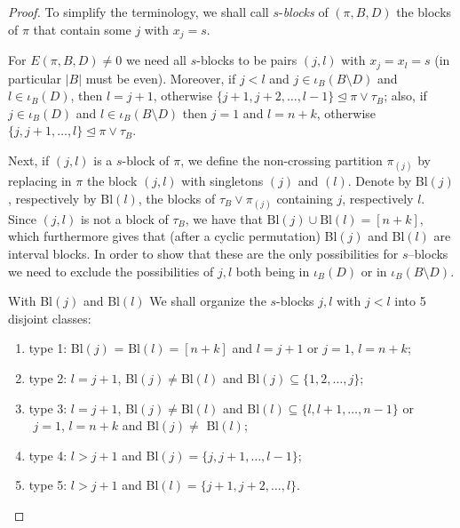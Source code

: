 \documentclass{amsart}
\begin{document}
\begin{proof}
 To simplify the terminology, we shall call $s$-\textit{blocks} of $(\pi, B, D)$ the blocks of $ \pi $ that contain some $j $ with $ x_j =s $.
 
For
 $ E(\pi, B, D) \neq 0$ 
 we need all $s$-blocks  to be pairs $ (j, l)$ with $x_j = x_l = s $ (in  particular $ | B |$ must be even). 
 Moreover, if $ j < l $ and
  $ j \in \iota_{B} (B \setminus D) $ 
  and $ l \in \iota_{B} (D) $, then $ l= j+1$, 
  otherwise 
  $\{ j+1, j+2, \dots, l-1\} \trianglelefteq \pi\vee \tau_B $; also, if 
  $ j \in \iota_{B}(D) $ 
  and 
  $ l \in \iota_{B}(B \setminus D)$
  then $ j=1$ and $ l=n+k $, otherwise
  $ \{ j, j+1, \dots, l\} \trianglelefteq \pi\vee \tau_B $.
  
   Next, if $ (j, l)$ is a $s$-block of $\pi $, we define the non-crossing partition $\pi_{(j)}$ by replacing in $\pi $ the block $(j, l)$ with singletons $ (j)$ and $(l)$. Denote by \textrm{Bl}$(j)$, respectively by \textrm{Bl}$(l)$, the blocks of
    $ \tau_B \vee \pi_{(j)} $
    containing $ j $, respectively $ l $. 
    Since $(j, l)$ is not a block of $ \tau_B $, we have that
    $ \textrm{Bl}(j) \cup \textrm{Bl}(l) = [n+k]$, which furthermore gives that (after a cyclic permutation) \textrm{Bl}$(j)$ and \textrm{Bl}$(l)$ are interval blocks.
    In order to show that these are the only possibilities for $s$--blocks we need to exclude the possibilities of $j,l$ both being in $\iota_{B}(D)$ or in $\iota_{B}(B\setminus D)$.
    
    With \textrm{Bl}$(j)$ and \textrm{Bl}$(l)$  We shall organize the $s$-blocks $j, l$ with $ j < l $ into 5 disjoint classes:
    \begin{enumerate}
    	\item[$\bullet$] type 1:
    	\textrm{Bl}$(j)$ = \textrm{Bl}$(l) = [n+k]$ 
    	and  $l = j+1 $
    	or $ j=1$, $ l = n+k $;
    	\item[$\bullet$] type 2:
    	$ l = j+1$,  \textrm{Bl}$(j) \neq $\textrm{Bl}$(l)$
    	and \textrm{Bl}$(j) \subseteq \{1, 2, \dots, j\}$;   
    \item[$\bullet$] type 3: 
    $ l = j+1$,  
    \textrm{Bl}$(j) \neq $\textrm{Bl}$(l)$ 
    and \textrm{Bl}$(l) \subseteq \{ l, l+1, \dots, n-1\}$
    or \\
    ${}$\hspace{1cm} $ j =1 $, $ l = n+k $ and \textrm{Bl}$(j) \neq $ \textrm{Bl}$(l)$;
     \item[$\bullet$] type 4:
      $l > j+1 $ and 
      \textrm{Bl}$(j) = \{j, j+1, \dots, l-1\}$;
      \item[$\bullet$] type 5:
      $l > j+1 $ and 
      \textrm{Bl}$(l) = \{ j+1, j+2, \dots, l \} $.
 \end{enumerate}
 

\end{proof}
\end{document}
